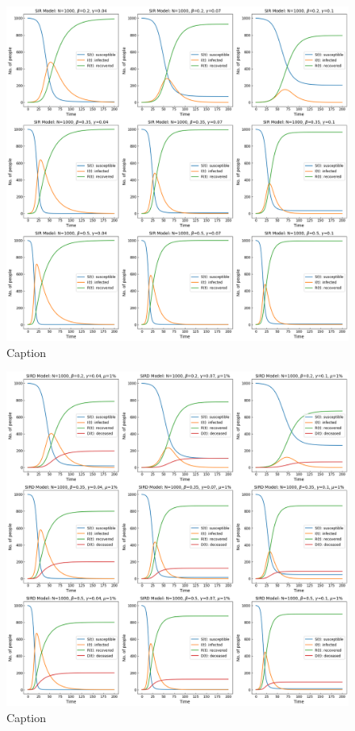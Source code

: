 \documentclass[12pt]{article}
\begin{document}
\begin{figure}
    \centering
    \includegraphics[scale=0.35]{SIR_Model_CTA200HQ2.png}
    \caption{Caption}
    \label{fig:my_label}
\end{figure}

\begin{figure}
    \centering
    \includegraphics[scale=0.35]{SIRD_Model_CTA200HQ2.png}
    \caption{Caption}
    \label{fig:my_label}
\end{figure} 
\end{document}
